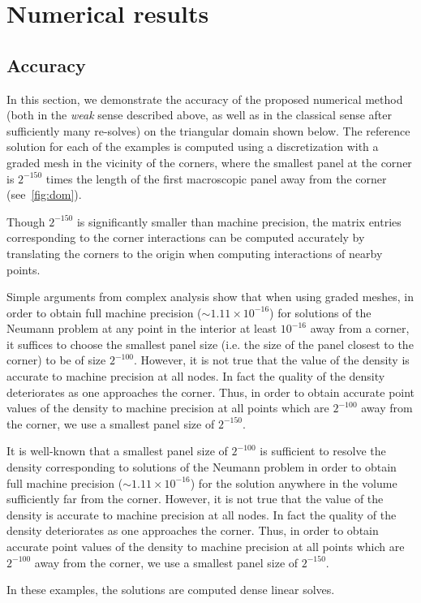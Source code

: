 
\section{Numerical results}
\subsection{Accuracy}
In this section, we demonstrate the accuracy of the proposed numerical method (both in the {\it weak} sense 
described above, 
as well as in the classical sense after sufficiently many re-solves) on the triangular domain shown below. 
The reference solution for each of the examples is computed using a discretization with
a graded mesh in the vicinity of the corners, where the smallest panel at the corner is $2^{-150}$ times
the length of the first macroscopic panel away from the corner (see~\cref{fig:dom}). 
\begin{rem}
Though $2^{-150}$ is significantly smaller than machine precision, the matrix entries corresponding to the
corner interactions can be computed accurately by {\color{red}translating the corners to the origin when 
computing interactions of nearby points.} 
\end{rem} 
\begin{rem}
Simple arguments from complex analysis show that when using graded meshes, in order to obtain full 
machine precision 
($\sim 1.11 \times 10^{-16}$) for solutions of the Neumann problem at any point in the interior 
at least $10^{-16}$ away from a corner, it suffices to choose the smallest panel size (i.e. the size of the 
panel closest to the corner) to be of size $2^{-100}.$ However, it is not true that the value of the density is 
accurate to machine precision at all nodes. In fact the quality
of the density deteriorates as one approaches the corner. Thus, in order to obtain accurate point values
of the density to machine precision at all points which are $2^{-100}$ away from the corner, we use a smallest
panel size of $2^{-150}$. 

It is well-known that a smallest panel size of $2^{-100}$ is sufficient to resolve the density corresponding
to solutions of the Neumann problem in order to obtain full machine precision {\color{red}($\sim 1.11 \times 10^{-16}$)} for the solution anywhere in the volume {\color{red} sufficiently far from the corner.}
However, it is not true that the value of the density is accurate to machine precision at all nodes. In fact the quality
of the density deteriorates as one approaches the corner. Thus, in order to obtain accurate point values
of the density to machine precision at all points which are $2^{-100}$ away from the corner, we use a smallest
panel size of $2^{-150}$. 
\end{rem}
In these examples, the solutions are computed dense linear solves.

